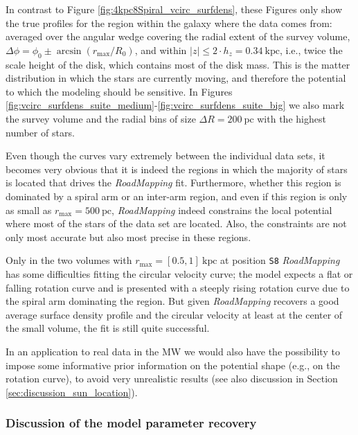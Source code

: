 \documentclass[iop,revtex4,numberedappendix,appendixfloats]{emulateapj}
\newcommand{\RM}{{\sl RoadMapping}}
\newcommand{\hiddenComment}[1]{}
\begin{document}
In contrast to Figure \ref{fig:4kpc8Spiral_vcirc_surfdens}, these Figures only show the true profiles for the region within the galaxy where the data comes from: averaged over the angular wedge covering the radial extent of the survey volume, $\Delta \phi = \phi_0 \pm \arcsin(r_\text{max}/R_0)$, and within $|z| \leq 2 \cdot h_z = 0.34~\text{kpc}$, i.e., twice the scale height of the disk, which contains most of the disk mass. This is the matter distribution in which the stars are currently moving, and therefore the potential to which the modeling should be sensitive. In Figures \ref{fig:vcirc_surfdens_suite_medium}-\ref{fig:vcirc_surfdens_suite_big} we also mark the survey volume and the radial bins of size $\Delta R =200~\text{pc}$ with the highest number of stars. 

Even though the curves vary extremely between the individual data sets, it becomes very obvious that it is indeed the regions in which the majority of stars is located that drives the \RM{} fit. Furthermore, whether this region is dominated by a spiral arm or an inter-arm region, and even if this region is only as small as $r_\text{max}=500~\text{pc}$, \RM{} indeed constrains the local potential where most of the stars of the data set are located. Also, the constraints are not only most accurate but also most precise in these regions.

Only in the two volumes with $r_\text{max}=[0.5,1]~\text{kpc}$ at position \texttt{S8} \RM{} has some difficulties fitting the circular velocity curve; the model expects a flat or falling rotation curve and is presented with a steeply rising rotation curve due to the spiral arm dominating the region. But given \RM{} recovers a good average surface density profile and the circular velocity at least at the center of the small volume, the fit is still quite successful. 

In an application to real data in the MW we would also have the possibility to impose some informative prior information on the potential shape (e.g., on the rotation curve), to avoid very unrealistic results (see also discussion in Section \ref{sec:discussion_sun_location}).


\hiddenComment{[TO DO: Jo writes: "It would be interesting to figure out a little more how we can determine whether we expect the fit to be strongly biased because we are using a volume that it sitting right on top of a massive spiral arm, although that is perhaps best kept for a later paper."]}

\subsubsection{Discussion of the model parameter recovery} \label{sec:parameter recovery}
\end{document}

